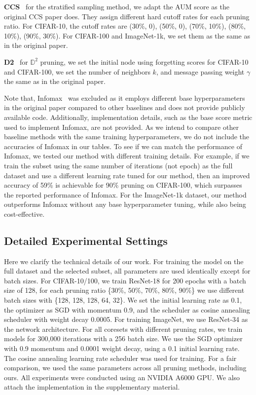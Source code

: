 \textbf{CCS}~\citep{zheng2022coverage} for the stratified sampling method, we adapt the AUM score as the original CCS paper does. They assign different hard cutoff rates for each pruning ratio. For CIFAR-10, the cutoff rates are (30\%, 0), (50\%, 0), (70\%, 10\%), (80\%, 10\%), (90\%, 30\%). For CIFAR-100 and ImageNet-1k, we set them as the same as in the original paper.

\textbf{D2}~\citep{maharana2023d2} for $\mathbb{D}^2$ pruning, we set the initial node using forgetting scores for CIFAR-10 and CIFAR-100, we set the number of neighbors $k$, and message passing weight $\gamma$ the same as in the original paper.

Note that, Infomax~\citep{tan2025data} was excluded as it employs different base hyperparameters in the original paper compared to other baselines and does not provide publicly available code.  Additionally, implementation details, such as the base score metric used to implement Infomax, are not provided. As we intend to compare other baseline methods with the same training hyperparameters, we do not include the accuracies of Infomax in our tables. %
To see if we can match the performance of Infomax, we tested our method with different training details. For example, if we train the subset using the same number of iterations (not epoch) as the full dataset and use a different learning rate tuned for our method, then an improved accuracy of 59\% is achievable for 90\% pruning on CIFAR-100, which surpasses the reported performance of Infomax. For the ImageNet-1k dataset, our method outperforms Infomax without any base hyperparameter tuning, while also being cost-effective.

\subsection{Detailed Experimental Settings}
\label{Appendix_Technical_Details_of_Ours}
Here we clarify the technical details of our work.
For training the model on the full dataset and the selected subset, all parameters are used identically except for batch sizes. For CIFAR-10/100, we train ResNet-18 for 200 epochs with a batch size of 128, for each pruning ratio \{30\%, 50\%, 70\%, 80\%, 90\%\} we use different batch sizes with \{128, 128, 128, 64, 32\}. We set the initial learning rate as 0.1, the optimizer as SGD with momentum 0.9, and the scheduler as cosine annealing scheduler with weight decay 0.0005.
For training ImageNet, we use ResNet-34 as the network architecture. For all coresets with different pruning rates, we train models for 300,000 iterations with a 256 batch size. We use the SGD optimizer with 0.9 momentum and 0.0001 weight decay, using a 0.1 initial learning rate. The cosine annealing learning rate scheduler was used for training. For a fair comparison, we used the same parameters across all pruning methods, including ours. All experiments were conducted using an NVIDIA A6000 GPU. We also attach the implementation in the supplementary material.


